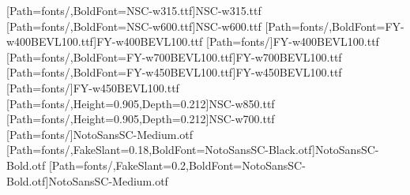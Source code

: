 [Path=fonts/,BoldFont=NSC-w315.ttf]{NSC-w315.ttf}
[Path=fonts/,BoldFont=NSC-w600.ttf]{NSC-w600.ttf}
[Path=fonts/,BoldFont=FY-w400BEVL100.ttf]{FY-w400BEVL100.ttf}
\newfontfamily{\libianlat}[Path=fonts/]{FY-w400BEVL100.ttf}
[Path=fonts/,BoldFont=FY-w700BEVL100.ttf]{FY-w700BEVL100.ttf}
[Path=fonts/,BoldFont=FY-w450BEVL100.ttf]{FY-w450BEVL100.ttf}
\newfontfamily{\libianslat}[Path=fonts/]{FY-w450BEVL100.ttf}
\newfontfamily{\numbold}[Path=fonts/,Height=0.905,Depth=0.212]{NSC-w850.ttf}
\newfontfamily{\numboldjian}[Path=fonts/,Height=0.905,Depth=0.212]{NSC-w700.ttf}
\newfontfamily{\numpnum}[Path=fonts/]{NotoSansSC-Medium.otf}
[Path=fonts/,FakeSlant=0.18,BoldFont=NotoSansSC-Black.otf]{NotoSansSC-Bold.otf}
[Path=fonts/,FakeSlant=0.2,BoldFont=NotoSansSC-Bold.otf]{NotoSansSC-Medium.otf}
